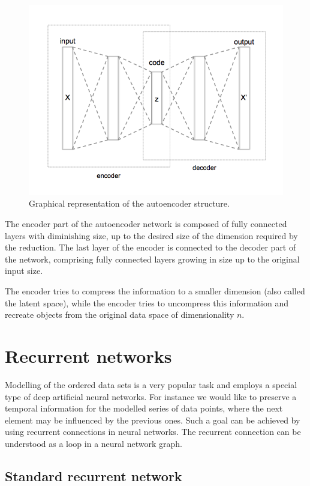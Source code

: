 \begin{figure}
  \centering
  \includegraphics[width=0.5\linewidth]{figures/chapter3/Autoencoder_structure.png}
  \caption[autoenc]{Graphical representation of the autoencoder structure\footnotemark. }
  \label{fig:autoenc}
\end{figure}


The encoder part of the autoencoder network is composed of fully connected layers with diminishing size, up to the desired size of the dimension required by the reduction.
The last layer of the encoder is connected to the decoder part of the network, comprising fully connected layers growing in size up to the original input size.

The encoder tries to compress the information to a smaller dimension (also called the latent space), while the encoder tries to uncompress this information and recreate objects from the original data space of dimensionality $n$.


\section{Recurrent networks}

Modelling of the ordered data sets is a very popular task and employs a special type of deep artificial neural networks. For instance we would like to preserve a temporal information for the modelled series of data points, where the next element may be influenced by the previous ones.
Such a goal can be achieved by using recurrent connections in neural networks.
The recurrent connection can be understood as a loop in a neural network graph.

\subsection{Standard recurrent network}

